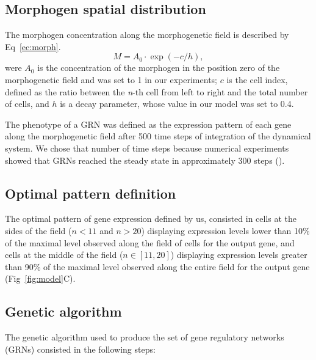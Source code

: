 \documentclass[10pt,letterpaper]{article}
\begin{document}
\subsection*{Morphogen spatial distribution}

The morphogen concentration along the morphogenetic field is described by
Eq~\ref{ec:morph}.
\begin{equation}
 M = A_0 \cdot \exp(-c/h),
 \label{ec:morph}
\end{equation}
\noindent
were $A_0$ is the concentration of the morphogen in the position zero of the
morphogenetic field and was set to 1 in our experiments; $c$ is the cell index,
defined as the ratio between the \emph{n}-th cell from left to right and the
total number of cells, and $h$ is a decay parameter, whose value in our model
was set to 0.4.

The phenotype of a GRN was defined as the expression pattern of each gene along
the morphogenetic field after 500 time steps of integration of the dynamical
system. We chose that number of time steps because numerical experiments showed
that GRNs reached the steady state in approximately 300 steps ().

\subsection*{Optimal pattern definition}

The optimal pattern of gene expression defined by us, consisted in cells at the
sides of the field ($n<11$ and $n>20$) displaying expression levels lower than
10\% of the maximal level observed along the field of cells for the output gene,
and cells at the middle of the field ($n ∈ [11,20]$) displaying expression
levels greater than 90\% of the maximal level observed along the entire field
for the output gene (Fig~\ref{fig:model}C).

\subsection*{Genetic algorithm}

The genetic algorithm used to produce the set of gene regulatory networks (GRNs)
consisted in the following steps:
\end{document}
